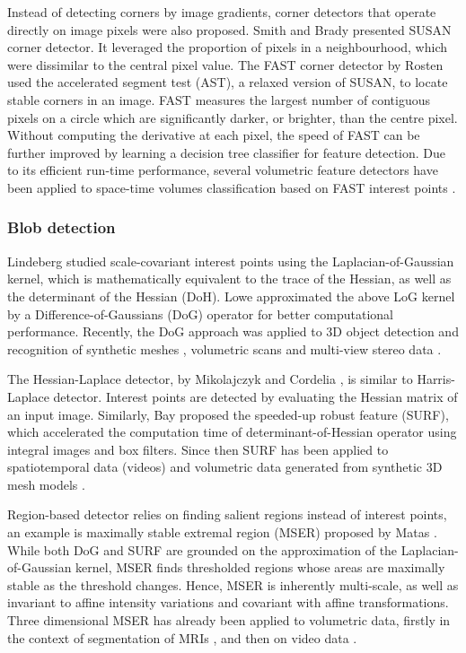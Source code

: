 Instead of detecting corners by image gradients, corner detectors that operate directly on image pixels were also proposed. 
Smith and Brady \cite{Smith1997} presented SUSAN corner detector. It leveraged the proportion of pixels in a neighbourhood, which were dissimilar to the central pixel value.
The FAST corner detector by Rosten \etal \cite{Rosten2010} used the accelerated segment test (AST), a relaxed version of SUSAN, to locate stable corners in an image.  
FAST measures the largest number of contiguous pixels on a circle which are significantly darker, or brighter, than the centre pixel. Without computing the derivative at each pixel, the speed of FAST can be further improved by learning a decision tree classifier for feature detection. Due to its efficient run-time performance, several volumetric feature detectors have been applied to space-time volumes classification based on FAST interest points \cite{Koelstra2009,Yu2010}. 

\subsubsection{Blob detection}

Lindeberg \cite{Lindeberg1998} studied scale-covariant interest points using the Laplacian-of-Gaussian kernel, which is mathematically equivalent to the trace of the Hessian, as well as the determinant of the Hessian (DoH). Lowe \cite{Lowe2004} approximated the above LoG kernel by a Difference-of-Gaussians (DoG) operator for better computational performance. Recently, the DoG approach was applied to 3D object detection and recognition of synthetic meshes \cite{Wessel2006}, volumetric scans \cite{Flitton2010} and multi-view stereo data \cite{Pham2011}.

The Hessian-Laplace detector, by Mikolajczyk and Cordelia \cite{Mikolajczyk2004}, is similar to Harris-Laplace detector. Interest points are detected by evaluating the Hessian matrix of an input image. Similarly, Bay \etal \cite{Bay2008} proposed the speeded-up robust feature (SURF), which accelerated the computation time of determinant-of-Hessian operator using integral images and box filters. Since then SURF has been applied to spatiotemporal data (videos) \cite{Willems2008} and volumetric data generated from synthetic 3D mesh models \cite{Knopp2010}.

Region-based detector relies on finding salient regions instead of interest points, an example is maximally stable extremal region (MSER) proposed by Matas \etal \cite{Matas2004}. 
While both DoG and SURF are grounded on the approximation of the Laplacian-of-Gaussian kernel, MSER finds thresholded regions whose areas are maximally stable as the threshold changes. 
Hence, MSER is inherently multi-scale, as well as invariant to affine intensity variations and covariant with affine transformations. Three dimensional MSER has already been applied to volumetric data, firstly in the context of segmentation of MRIs \cite{Donoser2006}, and then on video data \cite{Riemenschneider2009}.

